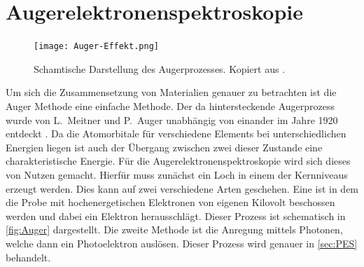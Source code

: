     \section{Augerelektronenspektroskopie} \label{sec:Auger}
        \begin{figure}
            \centering
            \texttt{[image: Auger-Effekt.png]}
            \caption{Schamtische Darstellung des Augerprozesses. Kopiert aus \cite{Auger-Bild}.}
            \label{fig:Auger}
        \end{figure}
        Um sich die Zusammensetzung von Materialien genauer zu betrachten ist die Auger Methode eine einfache Methode.
        Der da hintersteckende Augerprozess wurde von L.~Meitner und P.~Auger unabhängig von einander im Jahre \num{1920} entdeckt \cite{Auger-Prozess}.
        Da die Atomorbitale für verschiedene Elements bei unterschiedlichen Energien liegen ist auch der Übergang zwischen zwei dieser Zustande eine charakteristische Energie.
        Für die Augerelektronenspektroskopie wird sich dieses von Nutzen gemacht.
        Hierfür muss zunächst ein Loch in einem der Kernniveaus erzeugt werden.
        Dies kann auf zwei verschiedene Arten geschehen.
        Eine ist in dem die Probe mit hochenergetischen Elektronen von eigenen Kilovolt beschossen werden und dabei ein Elektron herausschlägt.
        Dieser Prozess ist schematisch in \autoref{fig:Auger} dargestellt.
        Die zweite Methode ist die Anregung mittels Photonen, welche dann ein Photoelektron auslösen.
        Dieser Prozess wird genauer in \autoref{sec:PES} behandelt.

